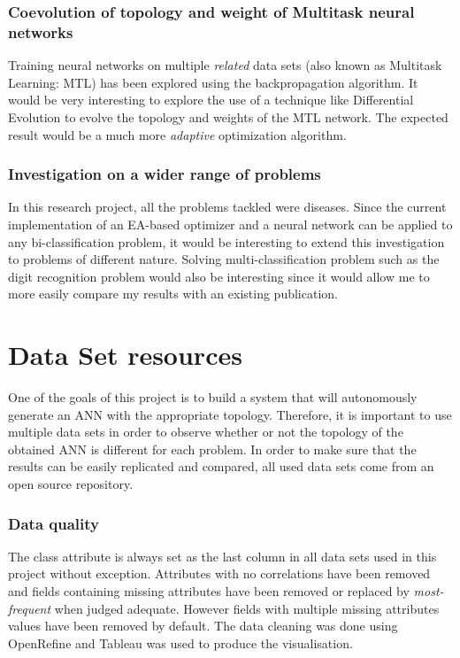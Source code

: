 \documentclass[a4paper,12pt, oneside]{memoir}
\begin{document}
\subsection{Coevolution of topology and weight of Multitask neural networks}

Training neural networks on multiple \textit{related} data sets (also known as Multitask Learning: MTL) has been explored using the backpropagation algorithm. It would be very interesting to explore the use of a technique like Differential Evolution to evolve the topology and weights of the MTL network. The expected result would be a much more \textit{adaptive} optimization algorithm.


\subsection{Investigation on a wider range of problems}

In this research project, all the problems tackled were diseases. Since the current implementation of an EA-based optimizer and a neural network can be applied to any bi-classification problem, it would be interesting to extend this investigation to problems of different nature. Solving multi-classification problem such as the digit recognition problem would also be interesting since it would allow me to more easily compare my results with an existing publication.

%
%
 
\newpage

\appendix
\chapter{Data Set resources} \label{App:AppendixA-data set-resources}

One of the goals of this project is to build a system that will autonomously generate an ANN with the appropriate topology. Therefore, it is important to use multiple data sets in order to observe whether or not the topology of the obtained ANN is different for each problem. In order to make sure that the results can be easily replicated and compared, all used data sets come from an open source repository.

\subsection{Data quality}

The class attribute is always set as the last column in all data sets used in this project without exception. Attributes with no correlations have been removed and fields containing missing attributes have been removed or replaced by \textit{most-frequent} when judged adequate. However fields with multiple missing attributes values have been removed by default. The data cleaning was done using OpenRefine and Tableau was used to produce the visualisation.
\end{document}
